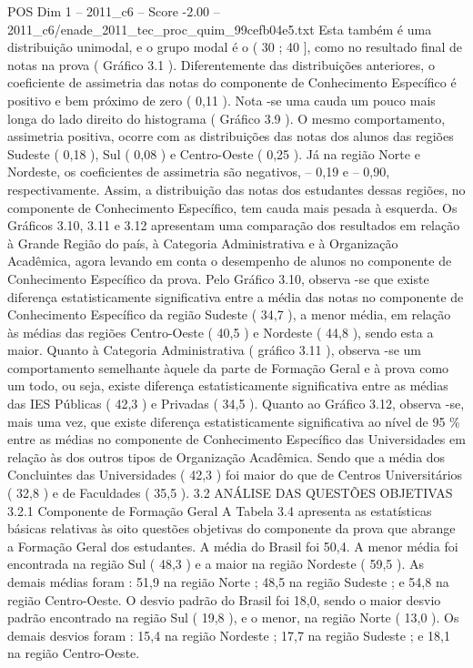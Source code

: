 \begin{textsample}{POS Dim 1 – 2011\_c6 – Score -2.00 – 2011\_c6/enade\_2011\_tec\_proc\_quim\_99cefb04e5.txt}
Esta também é uma distribuição unimodal, e o grupo modal é o ( 30 ; 40 ], como no resultado final de notas na prova ( Gráfico 3.1 ).
Diferentemente das distribuições anteriores, o coeficiente de assimetria das notas do componente de Conhecimento Específico é positivo e bem próximo de zero ( 0,11 ).
Nota -se uma cauda um pouco mais longa do lado direito do histograma ( Gráfico 3.9 ).
O mesmo comportamento, assimetria positiva, ocorre com as distribuições das notas dos alunos das regiões Sudeste ( 0,18 ), Sul ( 0,08 ) e Centro-Oeste ( 0,25 ).
Já na região Norte e Nordeste, os coeficientes de assimetria são negativos, – 0,19 e – 0,90, respectivamente.
Assim, a distribuição das notas dos estudantes dessas regiões, no componente de Conhecimento Específico, tem cauda mais pesada à esquerda.
Os Gráficos 3.10, 3.11 e 3.12 apresentam uma comparação dos resultados em relação à Grande Região do país, à Categoria Administrativa e à Organização Acadêmica, agora levando em conta o desempenho de alunos no componente de Conhecimento Específico da prova.
Pelo Gráfico 3.10, observa -se que existe diferença estatisticamente significativa entre a média das notas no componente de Conhecimento Específico da região Sudeste ( 34,7 ), a menor média, em relação às médias das regiões Centro-Oeste ( 40,5 ) e Nordeste ( 44,8 ), sendo esta a maior.
Quanto à Categoria Administrativa ( gráfico 3.11 ), observa -se um comportamento semelhante àquele da parte de Formação Geral e à prova como um todo, ou seja, existe diferença estatisticamente significativa entre as médias das IES Públicas ( 42,3 ) e Privadas ( 34,5 ).
Quanto ao Gráfico 3.12, observa -se, mais uma vez, que existe diferença estatisticamente significativa ao nível de 95 \% entre as médias no componente de Conhecimento Específico das Universidades em relação às dos outros tipos de Organização Acadêmica.
Sendo que a média dos Concluintes das Universidades ( 42,3 ) foi maior do que de Centros Universitários ( 32,8 ) e de Faculdades ( 35,5 ). 3.2 ANÁLISE DAS QUESTÕES OBJETIVAS 3.2.1 Componente de Formação Geral A Tabela 3.4 apresenta as estatísticas básicas relativas às oito questões objetivas do componente da prova que abrange a Formação Geral dos estudantes.
A média do Brasil foi 50,4.
A menor média foi encontrada na região Sul ( 48,3 ) e a maior na região Nordeste ( 59,5 ).
As demais médias foram : 51,9 na região Norte ; 48,5 na região Sudeste ; e 54,8 na região Centro-Oeste.
O desvio padrão do Brasil foi 18,0, sendo o maior desvio padrão encontrado na região Sul ( 19,8 ), e o menor, na região Norte ( 13,0 ).
Os demais desvios foram : 15,4 na região Nordeste ; 17,7 na região Sudeste ; e 18,1 na região Centro-Oeste.

\end{textsample}
